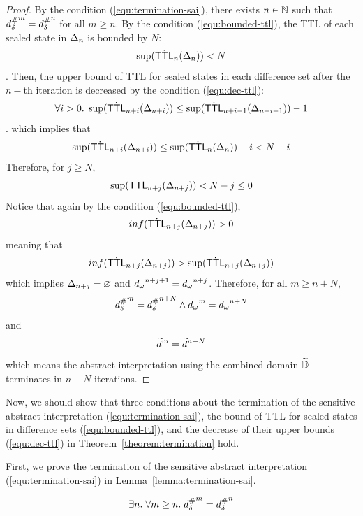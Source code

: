 \begin{proof}
  By the condition (\ref{equ:termination-sai}), there exists $n \in \mathbb{N}$
  such that ${{d}^{\#}_\delta}^m = {{d}^{\#}_\delta}^n$ for all $m \geq n$.  By the condition
  (\ref{equ:bounded-ttl}), the TTL of each sealed state in $\Delta_n$ is
  bounded by $N$:
  \[
    \sup(\dot {\textsf{TTL}}_n(\Delta_n)) < N
  \].
  Then, the upper bound of TTL for sealed states in each difference set after
  the $n-$th iteration is decreased by the condition (\ref{equ:dec-ttl}):
  \[
    \forall i > 0. \; \sup(\dot {\textsf{TTL}}_{n+i}(\Delta_{n+i})) \leq \sup(\dot
    {\textsf{TTL}}_{n+i-1}(\Delta_{n+i-1})) - 1
  \].
  which implies that
  \[
    \sup(\dot {\textsf{TTL}}_{n+i}(\Delta_{n+i})) \leq \sup(\dot {\textsf{TTL}}_n(\Delta_n)) - i < N - i
  \]
  Therefore, for $j \geq N$,
  \[
    \sup(\dot {\textsf{TTL}}_{n+j}(\Delta_{n+j})) < N - j \leq 0
  \]
  Notice that again by the condition (\ref{equ:bounded-ttl}),
  \[
    inf(\dot {\textsf{TTL}}_{n+j}(\Delta_{n+j})) > 0
  \]
  meaning that
  \[
    inf(\dot {\textsf{TTL}}_{n+j}(\Delta_{n+j})) > \sup(\dot {\textsf{TTL}}_{n+j}(\Delta_{n+j}))
  \]
  which implies $\Delta_{n+j} = \varnothing$ and ${{d}_\omega}^{n+j+1} =
  {{d}_\omega}^{n+j}$.
  Therefore, for all $m \geq n + N$,
  \[
    {{d}^{\#}_\delta}^m = {{d}^{\#}_\delta}^{n+N} \wedge {{d}_\omega}^m = {{d}_\omega}^{n+N}
  \]
  and
  \[
    \widetilde{d}^m = \widetilde{d}^{n+N}
  \]
  which means the abstract interpretation using the combined domain
  $\widetilde{\mathbb{D}}$ terminates in $n+N$ iterations.
\end{proof}

Now, we should show that three conditions about the termination of the sensitive
abstract interpretation (\ref{equ:termination-sai}), the bound of TTL for
sealed states in difference sets (\ref{equ:bounded-ttl}), and the decrease of
their upper bounds (\ref{equ:dec-ttl}) in Theorem~\ref{theorem:termination}
hold.

First, we prove the termination of the sensitive abstract interpretation
(\ref{equ:termination-sai}) in Lemma~\ref{lemma:termination-sai}.

\begin{lemma}\label{lemma:sabs-term}
\label{lemma:termination-sai}
  \[
    \exists n. \; \forall m \geq n. \;
    {{d}^{\#}_\delta}^m = {{d}^{\#}_\delta}^n
  \]
\end{lemma}

